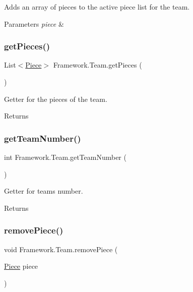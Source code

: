 Adds an array of pieces to the active piece list for the team. 
\begin{DoxyParams}{Parameters}
{\em piece} & \\
\hline
\end{DoxyParams}
\hypertarget{class_framework_1_1_team_a67366067e09cfa957a8745ebf894aa62}{}\label{class_framework_1_1_team_a67366067e09cfa957a8745ebf894aa62} 
\subsubsection{\texorpdfstring{get\+Pieces()}{getPieces()}}
{\footnotesize\ttfamily List$<$\hyperlink{class_framework_1_1_pieces_1_1_piece}{Piece}$>$ Framework.\+Team.\+get\+Pieces (\begin{DoxyParamCaption}{ }\end{DoxyParamCaption})}

Getter for the pieces of the team. \begin{DoxyReturn}{Returns}

\end{DoxyReturn}
\hypertarget{class_framework_1_1_team_a9636e5f189027878b25dcc03ece740e5}{}\label{class_framework_1_1_team_a9636e5f189027878b25dcc03ece740e5} 
\subsubsection{\texorpdfstring{get\+Team\+Number()}{getTeamNumber()}}
{\footnotesize\ttfamily int Framework.\+Team.\+get\+Team\+Number (\begin{DoxyParamCaption}{ }\end{DoxyParamCaption})}

Getter for team\textquotesingle{}s number. \begin{DoxyReturn}{Returns}

\end{DoxyReturn}
\hypertarget{class_framework_1_1_team_abe658d4774a4db816c46a4aa504bfd03}{}\label{class_framework_1_1_team_abe658d4774a4db816c46a4aa504bfd03} 
\subsubsection{\texorpdfstring{remove\+Piece()}{removePiece()}}
{\footnotesize\ttfamily void Framework.\+Team.\+remove\+Piece (\begin{DoxyParamCaption}\item[{\hyperlink{class_framework_1_1_pieces_1_1_piece}{Piece}}]{piece }\end{DoxyParamCaption})}

